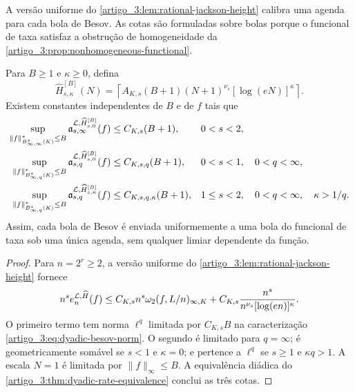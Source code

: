 A versão uniforme do \cref{artigo_3:lem:rational-jackson-height} calibra uma agenda para cada bola de Besov. As cotas são formuladas sobre bolas porque o funcional de taxa satisfaz a obstrução de homogeneidade da \cref{artigo_3:prop:nonhomogeneous-functional}.

\begin{corollary}\label{map:artigo_3:4.3}
\label{artigo_3:cor:uniform-besov-ball-embedding}
Para $B\ge1$ e $\kappa\ge0$, defina
\begin{equation}
 \widehat H_{s,\kappa}^{[B]}(N)
 =\left\lceil A_{K,s}(B+1)(N+1)^{\nu_s}
        [\log(eN)]^\kappa\right\rceil .
 \label{artigo_3:eq:ball-calibrated-height-schedule}
\end{equation}
Existem constantes independentes de $B$ e de $f$ tais que
\begin{align}
 \sup_{\|f\|_{B^s_{\infty,\infty}(K)}^*\le B}
 \mathfrak a_{s,\infty}^{\mathcal{L},
       \widehat H_{s,0}^{[B]}}(f)
 &\le C_{K,s}(B+1), &&0<s<2,\label{artigo_3:eq:uniform-ball-endpoint}\\
 \sup_{\|f\|_{B^s_{\infty,q}(K)}^*\le B}
 \mathfrak a_{s,q}^{\mathcal{L},
       \widehat H_{s,0}^{[B]}}(f)
 &\le C_{K,s,q}(B+1), &&0<s<1,\quad0<q<\infty,
 \label{artigo_3:eq:uniform-ball-subcritical}\\
 \sup_{\|f\|_{B^s_{\infty,q}(K)}^*\le B}
 \mathfrak a_{s,q}^{\mathcal{L},
       \widehat H_{s,\kappa}^{[B]}}(f)
 &\le C_{K,s,q,\kappa}(B+1),
 &&1\le s<2,\quad0<q<\infty,\quad\kappa>1/q.
 \label{artigo_3:eq:uniform-ball-critical}
\end{align}
Assim, cada bola de Besov é enviada uniformemente a uma bola do funcional de
taxa sob uma única agenda, sem qualquer limiar dependente da função.
\end{corollary}

\begin{proof}
Para $n=2^r\ge2$, a versão uniforme do
\cref{artigo_3:lem:rational-jackson-height} fornece
\[
 n^s e_n^{\mathcal{L},\widehat H}(f)
 \le C_{K,s}n^s\omega_2(f,L/n)_{\infty,K}
 +C_{K,s}\frac{n^s}{n^{\nu_s}[\log(en)]^\kappa}.
\]
O primeiro termo tem norma $\ell^q$ limitada por $C_{K,s}B$ na
caracterização \eqref{artigo_3:eq:dyadic-besov-norm}. O segundo é limitado para
$q=\infty$; é geometricamente somável se $s<1$ e $\kappa=0$; e pertence a
$\ell^q$ se $s\ge1$ e $\kappa q>1$. A escala $N=1$ é limitada por
$\|f\|_\infty\le B$. A equivalência diádica do
\cref{artigo_3:thm:dyadic-rate-equivalence} conclui as três cotas.
\end{proof}

